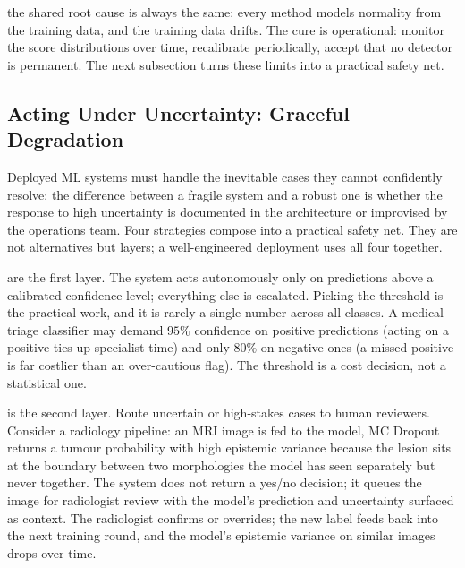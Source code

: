 
 the shared root cause is always the same: every method models normality from the training data, and the training data drifts.
The cure is operational: monitor the score distributions over time, recalibrate periodically, accept that no detector is permanent.
The next subsection turns these limits into a practical safety net.


\subsection{Acting Under Uncertainty: Graceful Degradation}


Deployed ML systems must handle the inevitable cases they cannot confidently resolve; the difference between a fragile system and a robust one is whether the response to high uncertainty is documented in the architecture or improvised by the operations team.
Four strategies compose into a practical safety net.
They are not alternatives but layers; a well-engineered deployment uses all four together.

 are the first layer.
The system acts autonomously only on predictions above a calibrated confidence level; everything else is escalated.
Picking the threshold is the practical work, and it is rarely a single number across all classes.
A medical triage classifier may demand $95\%$ confidence on positive predictions (acting on a positive ties up specialist time) and only $80\%$ on negative ones (a missed positive is far costlier than an over-cautious flag).
The threshold is a cost decision, not a statistical one.

 is the second layer.
Route uncertain or high-stakes cases to human reviewers.
Consider a radiology pipeline: an MRI image is fed to the model, MC Dropout returns a tumour probability with high epistemic variance because the lesion sits at the boundary between two morphologies the model has seen separately but never together.
The system does not return a yes/no decision; it queues the image for radiologist review with the model's prediction and uncertainty surfaced as context.
The radiologist confirms or overrides; the new label feeds back into the next training round, and the model's epistemic variance on similar images drops over time.

